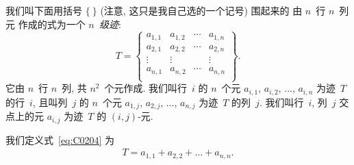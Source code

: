 \documentclass[../libro]{subfiles}
\begin{document}
\begin{definition}
    我们叫下面用括号 \(\{ \ \}\)
    (注意, 这只是我自己选的一个记号)
    围起来的%
    由 \(n\)~行 \(n\)~列元%
    作成的式为一个 \emph{\(n\)~级迹}:
    \begin{equation}
        T =
        \begin{Bmatrix}
            a_{1,1} & a_{1,2} & \cdots & a_{1,n} \\
            a_{2,1} & a_{2,2} & \cdots & a_{2,n} \\
            \vdots  & \vdots  & {}     & \vdots  \\
            a_{n,1} & a_{n,2} & \cdots & a_{n,n} \\
        \end{Bmatrix}.
        \label{eq:C0204}
    \end{equation}
    它由 \(n\)~行 \(n\)~列, 共 \(n^2\)~个元作成.
    我们叫行~\(i\) 的 \(n\)~个元
    \(a_{i,1}\), \(a_{i,2}\), \(\dots\), \(a_{i,n}\)
    为迹~\(T\) 的行~\(i\),
    且叫列~\(j\) 的 \(n\)~个元
    \(a_{1,j}\), \(a_{2,j}\), \(\dots\), \(a_{n,j}\)
    为迹~\(T\) 的列~\(j\).
    我们叫行~\(i\), 列~\(j\) 交点上的元 \(a_{i,j}\)
    为迹~\(T\) 的 \((i,j)\)-元.

    我们定义式~\eqref{eq:C0204} 为
    \begin{align*}
        T = a_{1,1} + a_{2,2} + \dots + a_{n,n}.
    \end{align*}
\end{definition}


\end{document}
